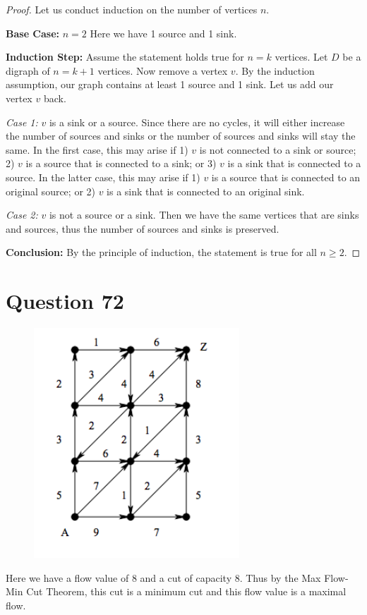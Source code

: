 \documentclass[11pt, oneside]{article}   	%
\begin{document}
\begin{proof}
Let us conduct induction on the number of vertices $n$.

\textbf{Base Case:} $n=2$
\vspace{1cm}
Here we have 1 source and 1 sink.

\textbf{Induction Step:} Assume the statement holds true for $n=k$ vertices. Let $D$ be a digraph of $n=k+1$ vertices. Now remove a vertex $v$. By the induction assumption, our graph contains at least 1 source and 1 sink. Let us add our vertex $v$ back.

\emph{Case 1:} $v$ is a sink or a source. Since there are no cycles, it will either increase the number of sources and sinks or the number of sources and sinks will stay the same. In the first case, this may arise if 1) $v$ is not connected to a sink or source; 2) $v$ is a source that is connected to a sink; or 3) $v$ is a sink that is connected to a source. In the latter case, this may arise if 1) $v$ is a source that is connected to an original source; or 2) $v$ is a sink that is connected to an original sink.

\emph{Case 2:} $v$ is not a source or a sink. Then we have the same vertices that are sinks and sources, thus the number of sources and sinks is preserved. 

\textbf{Conclusion:} By the principle of induction,  the statement is true for all $n \geq 2$.

\end{proof}



\section*{Question 72}

\begin{figure}[h]                                   
\begin{center}
\includegraphics[width=.4\textwidth]{q72.png}
\end{center}
\end{figure}

Here we have a flow value of 8 and a cut of capacity 8. Thus by the Max Flow-Min Cut Theorem, this cut is a minimum cut and this flow value is a maximal flow.
\end{document}
